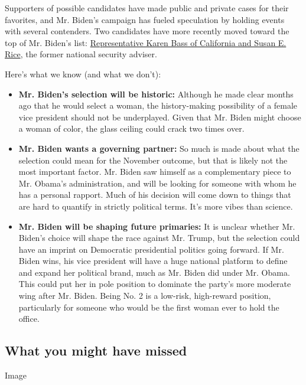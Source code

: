 Supporters of possible candidates have made public and private cases for
their favorites, and Mr. Biden's campaign has fueled speculation by
holding events with several contenders. Two candidates have more
recently moved toward the top of Mr. Biden's list:
\href{https://www.nytimes.com/2020/07/31/us/politics/joseph-biden-vice-president.html}{Representative
Karen Bass of California and Susan E. Rice}, the former national
security adviser.

Here's what we know (and what we don't):

\begin{itemize}
\item
  \textbf{Mr. Biden's selection will be historic:} Although he made
  clear months ago that he would select a woman, the history-making
  possibility of a female vice president should not be underplayed.
  Given that Mr. Biden might choose a woman of color, the glass ceiling
  could crack two times over.
\item
  \textbf{Mr. Biden wants a governing partner:} So much is made about
  what the selection could mean for the November outcome, but that is
  likely not the most important factor. Mr. Biden saw himself as a
  complementary piece to Mr. Obama's administration, and will be looking
  for someone with whom he has a personal rapport. Much of his decision
  will come down to things that are hard to quantify in strictly
  political terms. It's more vibes than science.
\item
  \textbf{Mr. Biden will be shaping future primaries:} It is unclear
  whether Mr. Biden's choice will shape the race against Mr. Trump, but
  the selection could have an imprint on Democratic presidential
  politics going forward. If Mr. Biden wins, his vice president will
  have a huge national platform to define and expand her political
  brand, much as Mr. Biden did under Mr. Obama. This could put her in
  pole position to dominate the party's more moderate wing after Mr.
  Biden. Being No. 2 is a low-risk, high-reward position, particularly
  for someone who would be the first woman ever to hold the office.
\end{itemize}

\hypertarget{what-you-might-have-missed}{%
\subsection{What you might have
missed}\label{what-you-might-have-missed}}

Image

